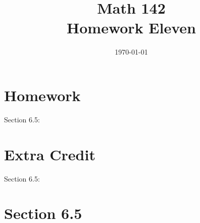 \documentclass{exam}
\author{}
\date{\today}
\title{Math 142 \\ Homework Eleven}
\begin{document}
  \maketitle

  \section{Homework}
  Section 6.5: 

  \section{Extra Credit}
  Section 6.5: 

  \ifprintanswers

    \section{Section 6.5}
\end{document}
